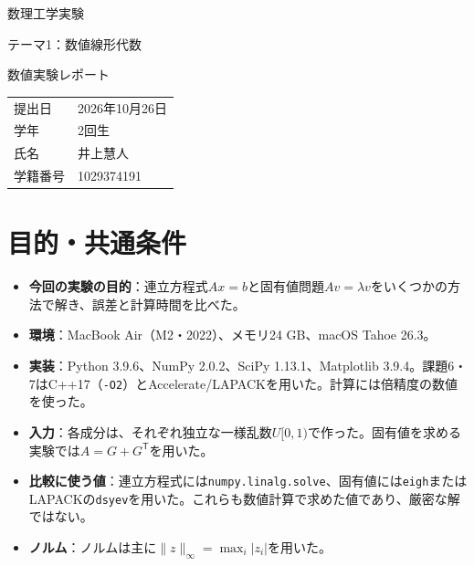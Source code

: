 \documentclass[a4paper,11pt]{article}
\begin{document}
\hypersetup{pageanchor=false}
\begin{titlepage}
\centering
{\Large 数理工学実験\par}
\vspace{12mm}
{\LARGE テーマ1：数値線形代数\par}
\vspace{8mm}
{\large 数値実験レポート\par}
\vspace{25mm}
\begin{tabular}{ll}
提出日 & 2026年10月26日\\[8mm]
学年 & 2回生\\[8mm]
氏名 & 井上慧人\\[8mm]
学籍番号 & 1029374191
\end{tabular}
\vfill
\end{titlepage}
\hypersetup{pageanchor=true}

\begin{abstract}
消去法とLU法、べき乗法やQR法を使い、誤差と計算時間を比べた。消去法とLU法の計算時間の増え方は、$O(n^3)$から予想されるものに近かった。べき乗法と逆反復法を組み合わせると、100次では約1.27倍速くなった。通常のQR法は400回中267回、シフト・減次法は400回すべてで収束した。
\end{abstract}

\section{目的・共通条件}
\begin{itemize}
\item \textbf{今回の実験の目的}：連立方程式$Ax=b$と固有値問題$Av=\lambda v$をいくつかの方法で解き、誤差と計算時間を比べた。
\item \textbf{環境}：MacBook Air（M2・2022）、メモリ24 GB、macOS Tahoe 26.3。
\item \textbf{実装}：Python 3.9.6、NumPy 2.0.2、SciPy 1.13.1、Matplotlib 3.9.4。課題6・7はC++17（\texttt{-O2}）とAccelerate/LAPACKを用いた。計算には倍精度の数値を使った。
\item \textbf{入力}：各成分は、それぞれ独立な一様乱数$U[0,1)$で作った。固有値を求める実験では$A=G+G^{\mathsf T}$を用いた。
\item \textbf{比較に使う値}：連立方程式には\texttt{numpy.linalg.solve}、固有値には\texttt{eigh}またはLAPACKの\texttt{dsyev}を用いた。これらも数値計算で求めた値であり、厳密な解ではない。
\item \textbf{ノルム}：ノルムは主に$\|z\|_\infty=\max_i|z_i|$を用いた。
\end{itemize}
\end{document}
